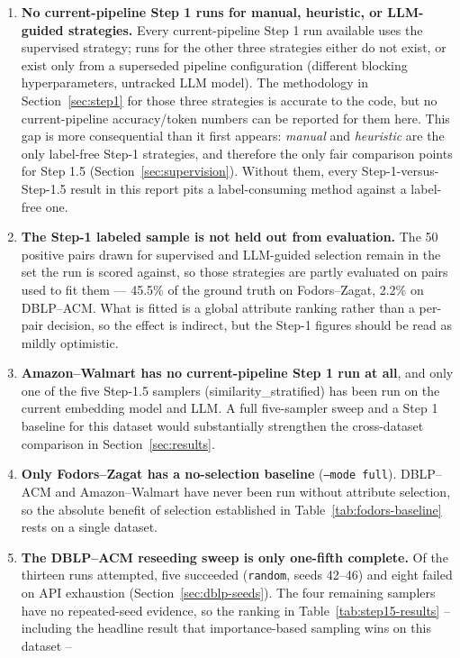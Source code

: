 \documentclass[11pt]{article}
\begin{document}
\begin{enumerate}
\item \textbf{No current-pipeline Step 1 runs for manual, heuristic, or LLM-guided
strategies.} Every current-pipeline Step 1 run available uses the supervised
strategy; runs for the other three strategies either do not exist, or exist only
from a superseded pipeline configuration (different blocking hyperparameters,
untracked LLM model). The methodology in Section~\ref{sec:step1} for those three
strategies is accurate to the code, but no current-pipeline accuracy/token numbers
can be reported for them here. This gap is more consequential than it first appears:
\emph{manual} and \emph{heuristic} are the only label-free Step-1 strategies, and
therefore the only fair comparison points for Step 1.5 (Section~\ref{sec:supervision}).
Without them, every Step-1-versus-Step-1.5 result in this report pits a
label-consuming method against a label-free one.
\item \textbf{The Step-1 labeled sample is not held out from evaluation.} The 50
positive pairs drawn for supervised and LLM-guided selection remain in the set the
run is scored against, so those strategies are partly evaluated on pairs used to fit
them --- 45.5\% of the ground truth on Fodors--Zagat, 2.2\% on DBLP--ACM. What is
fitted is a global attribute ranking rather than a per-pair decision, so the effect is
indirect, but the Step-1 figures should be read as mildly optimistic.
\item \textbf{Amazon--Walmart has no current-pipeline Step 1 run at all}, and only
one of the five Step-1.5 samplers (similarity\_stratified) has been run on the
current embedding model and LLM. A full five-sampler sweep and a Step 1 baseline
for this dataset would substantially strengthen the cross-dataset comparison in
Section~\ref{sec:results}.
\item \textbf{Only Fodors--Zagat has a no-selection baseline}
(\texttt{--mode full}). DBLP--ACM and Amazon--Walmart have never been run without
attribute selection, so the absolute benefit of selection established in
Table~\ref{tab:fodors-baseline} rests on a single dataset.
\item \textbf{The DBLP--ACM reseeding sweep is only one-fifth complete.} Of the
thirteen runs attempted, five succeeded (\texttt{random}, seeds 42--46) and eight
failed on API exhaustion (Section~\ref{sec:dblp-seeds}). The four remaining samplers
have no repeated-seed evidence, so the ranking in Table~\ref{tab:step15-results} --
including the headline result that importance-based sampling wins on this dataset --

\end{enumerate}
\end{document}

